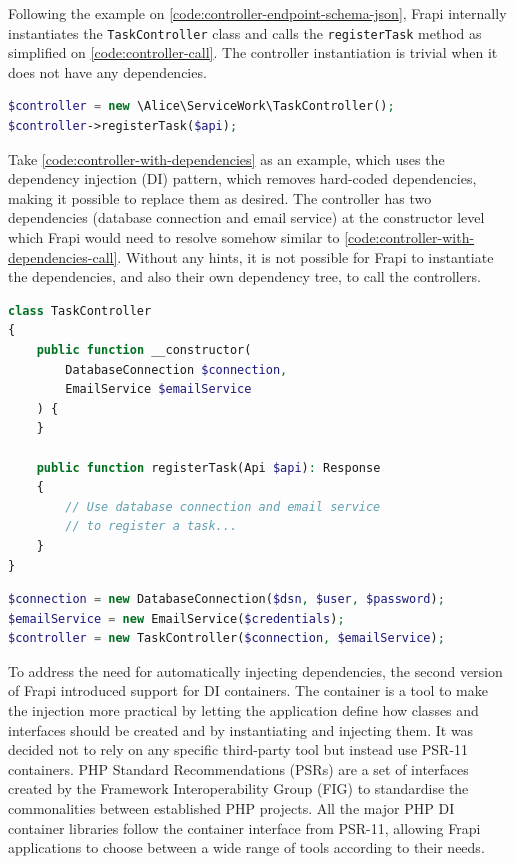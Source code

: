 Following the example on \autoref{code:controller-endpoint-schema-json}, Frapi internally instantiates the \texttt{TaskController} class and calls the \texttt{registerTask} method as simplified on \autoref{code:controller-call}. The controller instantiation is trivial when it does not have any dependencies.

\begin{lstlisting}[language=PHP,label={code:controller-call},caption={Controller class instantiation.}]
$controller = new \Alice\ServiceWork\TaskController();
$controller->registerTask($api);
\end{lstlisting}

Take \autoref{code:controller-with-dependencies} as an example, which uses the dependency injection (DI) \cite{php-the-right-way-di} pattern, which removes hard-coded dependencies, making it possible to replace them as desired. The controller has two dependencies (database connection and email service) at the constructor level which Frapi would need to resolve somehow similar to \autoref{code:controller-with-dependencies-call}. Without any hints, it is not possible for Frapi to instantiate the dependencies, and also their own dependency tree, to call the controllers.

\begin{lstlisting}[language=PHP,label={code:controller-with-dependencies},caption={Controller class with dependencies.}]
class TaskController
{
	public function __constructor(
		DatabaseConnection $connection,
		EmailService $emailService
	) {
	}

	public function registerTask(Api $api): Response
	{
		// Use database connection and email service
		// to register a task...
	}
}
\end{lstlisting}

\begin{lstlisting}[language=PHP,label={code:controller-with-dependencies-call},caption={Manual instantiation of the controller class.}]
$connection = new DatabaseConnection($dsn, $user, $password);
$emailService = new EmailService($credentials);
$controller = new TaskController($connection, $emailService);
\end{lstlisting}

To address the need for automatically injecting dependencies, the second version of Frapi introduced support for DI containers. The container is a tool to make the injection more practical by letting the application define how classes and interfaces should be created and by instantiating and injecting them. It was decided not to rely on any specific third-party tool but instead use PSR-11 \cite{psr-11} containers. PHP Standard Recommendations (PSRs) are a set of interfaces created by the Framework Interoperability Group (FIG) \cite{fig-website} to standardise the commonalities between established PHP projects. All the major PHP DI container libraries follow the container interface from PSR-11, allowing Frapi applications to choose between a wide range of tools according to their needs.

